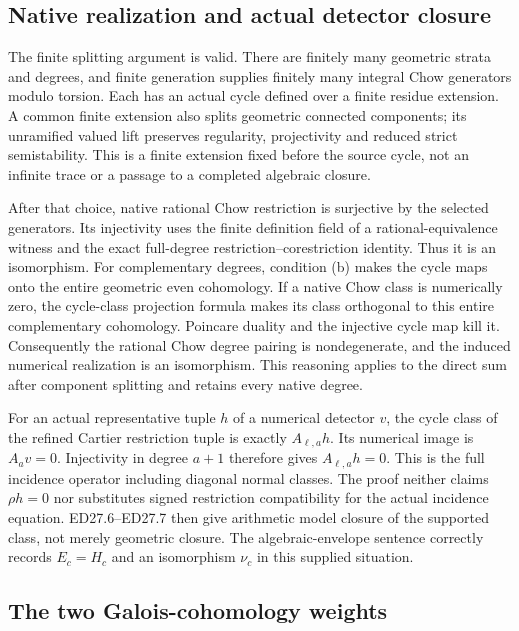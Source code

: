 \subsection{Native realization and actual detector closure}

The finite splitting argument is valid. There are finitely many
geometric strata and degrees, and finite generation supplies finitely
many integral Chow generators modulo torsion. Each has an actual cycle
defined over a finite residue extension. A common finite extension also
splits geometric connected components; its unramified valued lift
preserves regularity, projectivity and reduced strict semistability.
This is a finite extension fixed before the source cycle, not an infinite
trace or a passage to a completed algebraic closure.

After that choice, native rational Chow restriction is surjective by
the selected generators. Its injectivity uses the finite definition
field of a rational-equivalence witness and the exact full-degree
restriction--corestriction identity. Thus it is an isomorphism.
For complementary degrees, condition (b) makes the cycle maps onto
the entire geometric even cohomology. If a native Chow class is
numerically zero, the cycle-class projection formula makes its class
orthogonal to this entire complementary cohomology. Poincare duality
and the injective cycle map kill it. Consequently the rational Chow
degree pairing is nondegenerate, and the induced numerical realization
is an isomorphism. This reasoning applies to the direct sum after
component splitting and retains every native degree.

For an actual representative tuple $h$ of a numerical detector $v$,
the cycle class of the refined Cartier restriction tuple is exactly
$A_{\ell,a}h$. Its numerical image is $A_av=0$. Injectivity in degree
$a+1$ therefore gives $A_{\ell,a}h=0$. This is the full incidence
operator including diagonal normal classes. The proof neither claims
$\rho h=0$ nor substitutes signed restriction compatibility for the
actual incidence equation. ED27.6--ED27.7 then give arithmetic
model closure of the supported class, not merely geometric closure.
The algebraic-envelope sentence correctly records $E_c=H_c$ and
an isomorphism $\nu_c$ in this supplied situation.

\subsection{The two Galois-cohomology weights}

